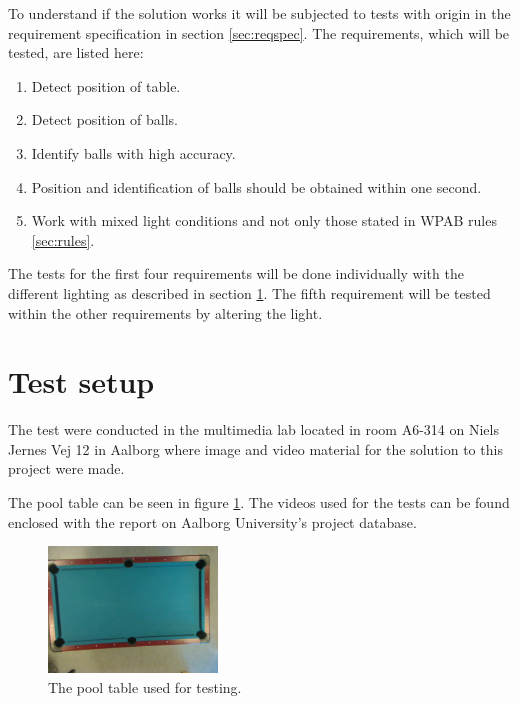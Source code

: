 To understand if the solution works it will be subjected to tests with origin in the requirement specification in section \ref{sec:reqspec}. The requirements, which will be tested, are listed here:

\begin{enumerate}
\setlength{\itemsep}{0mm}
	\item Detect position of table.
	\item Detect position of balls.
	\item Identify balls with high accuracy.
	\item Position and identification of balls should be obtained within one second.
	\item Work with mixed light conditions and not only those stated in WPAB rules \ref{sec:rules}.
\end{enumerate}

The tests for the first four requirements will be done individually with the different lighting as described in section \ref{sec:testsetup}. The fifth requirement will be tested within the other requirements by altering the light.

\section{Test setup}
\label{sec:testsetup}
The test were conducted in the multimedia lab located in room A6-314 on Niels Jernes Vej 12 in Aalborg where image and video material for the solution to this project were made. 

The pool table can be seen in figure \ref{fig:pooltableimg}. The videos used for the tests can be found enclosed with the report on Aalborg University's project database.

\begin{figure}[H]
\begin{center}
\leavevmode
\includegraphics[width=0.4\textwidth]{images/test/light/input}
\end{center}
   \caption{The pool table used for testing.}
  \label{fig:pooltableimg}
\end{figure} 

